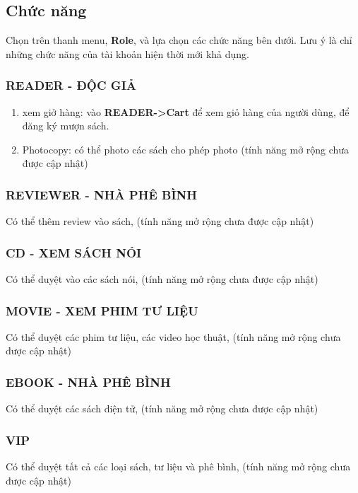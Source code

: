 \documentclass[12pt,a4paper]{report}
\begin{document}
        \subsection{Chức năng}
            Chọn trên thanh menu, \textbf{Role}, và lựa chọn các chức năng bên dưới. Lưu ý là chỉ những chức năng của tài khoản hiện thời mới khả dụng.\\
            \subsubsection{READER - ĐỘC GIẢ}
            \begin{enumerate}
                \item xem giở hàng: vào \textbf{READER->Cart} để xem giỏ hàng của người dùng, để đăng ký mượn sách.
                \item Photocopy: có thể photo các sách cho phép photo (tính năng mở rộng chưa được cập nhật)
            \end{enumerate}
            \subsubsection{REVIEWER - NHÀ PHÊ BÌNH}
            Có thể thêm review vào sách, (tính năng mở rộng chưa được cập nhật)\\
            \subsubsection{CD - XEM SÁCH NÓI}
            Có thể duyệt vào các sách nói, (tính năng mở rộng chưa được cập nhật)\\
            \subsubsection{MOVIE - XEM PHIM TƯ LIỆU}
            Có thể duyệt các phim tư liệu, các video học thuật, (tính năng mở rộng chưa được cập nhật)\\
            \subsubsection{EBOOK - NHÀ PHÊ BÌNH}
            Có thể duyệt các sách điện tử, (tính năng mở rộng chưa được cập nhật)\\
            \subsubsection{VIP}
            Có thể duyệt tất cả các loại sách, tư liệu và phê bình, (tính năng mở rộng chưa được cập nhật)\\
\end{document}
